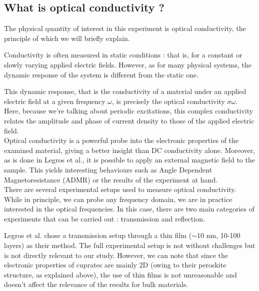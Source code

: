 \subsection{What is optical conductivity ?}
The physical quantity of interest in this experiment is optical conductivity, 
the principle of which we will briefly explain.

Conductivity is often measured in static conditions : 
that is, for a constant or slowly varying applied electric fields. 
However, as for many physical systems, 
the dynamic response of the system is different from the static one. 

This dynamic response, 
that is the conductivity of a material under an applied electric field at a given frequency $\omega$, 
is precisely the optical conductivity $\sigma{\omega}$. 
Here, because we're talking about periodic excitations, this complex conductivity relates the amplitude and phase of current density to those of the applied electric field. \\

Optical conductivity is a powerful probe into the electronic properties of the examined material, 
giving a better insight than DC conductivity alone. 
Moreover, as is done in Legros et al., 
it is possible to apply an external magnetic field to the sample. 
This yields interesting behaviours such as Angle Dependent Magnetoresistance (ADMR) 
or the results of the experiment at hand. \\

There are several experimental setups used to measure optical conductivity. 
While in principle, we can probe any frequency domain, 
we are in practice interested in the optical frequencies. 
In this case, there are two main categories of experiments that can be carried out : 
transmission and reflection. 


Legros et al. chose a transmission setup through a thin film ($\sim 10$ nm, 10-100 layers) as their method. 
The full experimental setup is not without challenges but is not directly relevant to our study. 
However, we can note that since the electronic properties of cuprates are mainly 2D 
(owing to their peroskite structure, as explained above), 
the use of thin films is not unreasonable 
and doesn't affect the relevance of the results for bulk materials.